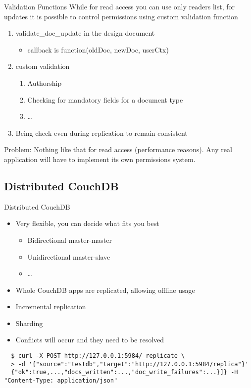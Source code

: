 \documentclass{beamer}
\begin{document}
\begin{frame}{Validation Functions}
  While for read access you can use only readers list, for updates
  it is possible to control permissions using custom validation function
  \begin{enumerate}
    \item validate\_doc\_update in the design document
    \begin{itemize}
      \item callback is function(oldDoc, newDoc, userCtx)
    \end{itemize}
    \item custom validation
    \begin{enumerate}
      \item Authorship
      \item Checking for mandatory fields for a document type
      \item \ldots
    \end{enumerate}
    \item Being check even during replication to remain consistent
  \end{enumerate}
  Problem: Nothing like that for read access (performance reasons).
  Any real application will have to implement its own permissions system.
\end{frame}

\subsection{Distributed CouchDB}
\begin{frame}[fragile]{Distributed CouchDB}
  \begin{itemize}
    \item Very flexible, you can decide what fits you best
    \begin{itemize}
      \item Bidirectional master-master
      \item Unidirectional master-slave
      \item \ldots
    \end{itemize}
    \item Whole CouchDB apps are replicated, allowing offline usage
    \item Incremental replication
    \item Sharding
    \item Conflicts will occur and they need to be resolved
  \end{itemize}
  \fontsize{6}{8}\selectfont
  \begin{verbatim}
  $ curl -X POST http://127.0.0.1:5984/_replicate \
  > -d '{"source":"testdb","target":"http://127.0.0.1:5984/replica"}'
  {"ok":true,...,"docs_written":...,"doc_write_failures":...}]} -H "Content-Type: application/json"
  \end{verbatim}
\end{frame}
\end{document}
